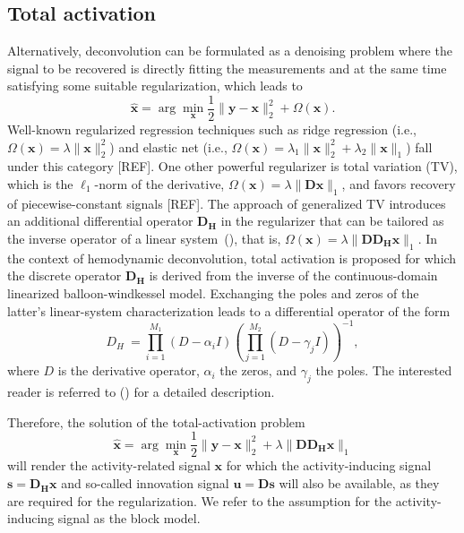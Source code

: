 
\subsection{Total activation}
Alternatively,  deconvolution can be formulated as a denoising problem where the signal to be recovered is directly fitting the measurements and at the same time satisfying some suitable regularization, which leads to
\begin{equation}
    \hat{\mathbf{x}} = \arg \min_{\mathbf{x}} \frac{1}{2} \| \mathbf{y} - \mathbf{x} \|_2^2 + \Omega(\mathbf{x}).
\end{equation}
Well-known regularized regression techniques such as ridge regression (i.e., $\Omega(\mathbf{x})=\lambda\|\mathbf{x}\|_2^2$) and elastic net (i.e., $\Omega(\mathbf{x})=\lambda_1\|\mathbf{x}\|_2^2 + \lambda_2\|\mathbf{x}\|_1$) fall under this category [REF]. One other powerful regularizer is total variation (TV), which is the $\ell_1$-norm of the derivative, $\Omega(\mathbf{x})=\lambda \|\mathbf{Dx}\|_1$, and favors recovery of piecewise-constant signals [REF]. The approach of generalized TV introduces an additional differential operator $\mathbf{D_H}$ in the regularizer that can be tailored as the inverse operator of a linear system~(\citealt{karahanoglu2011SignalProcessingApproacha}), that is, $\Omega(\mathbf{x})=\lambda \|\mathbf{D D_H x}\|_1$. In the context of hemodynamic deconvolution, total activation is proposed for which the discrete operator $\mathbf{D_H}$ is derived from the inverse of the continuous-domain linearized balloon-windkessel model. Exchanging the poles and zeros of the latter's linear-system characterization leads to a differential operator of the form 
\begin{equation}
    D_H\ = \prod_{i=1}^{M_1} (D-\alpha_i I) (\prod_{j=1}^{M_2} (D - \gamma_j I))^{-1},
\end{equation}
where \(D\) is the derivative operator, \(\alpha_i\) the zeros, and \(\gamma_j\) the poles. The interested reader is referred to (\citealt{karahanoglu2013TotalActivationfMRI}) for a detailed description. 

Therefore, the solution of the total-activation problem 
\begin{equation}
    \hat{\mathbf{x}} = \arg \min_{\mathbf{x}} \frac{1}{2} \| \mathbf{y} - \mathbf{x} \|_2^2 + \lambda \| \mathbf{D D_H x} \|_1
\end{equation}
will render the activity-related signal $\mathbf{x}$ for which the activity-inducing signal $\mathbf{s}=\mathbf{D_H x}$ and so-called innovation signal $\mathbf{u}=\mathbf{Ds}$ will also be available, as they are required for the regularization. We refer to the assumption for the activity-inducing signal as the block model.


